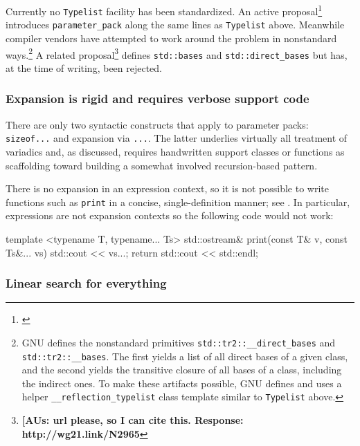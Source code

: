 \noindent Currently no \lstinline!Typelist! facility has been standardized. An active
proposal{\cprotect\footnote{\cite{spertus13}}}
introduces \lstinline!parameter_pack! along the same lines as
\lstinline!Typelist! above. Meanwhile compiler vendors have attempted to
work around the problem in nonstandard ways.{\cprotect\footnote{GNU
defines the nonstandard primitives
\lstinline!std::tr2::__direct_bases! and \lstinline!std::tr2::__bases!.
The first yields a list of all direct bases of a given class, and the
second yields the transitive closure of all bases of a class,
including the indirect ones. To make these artifacts possible, GNU
defines and uses a helper \lstinline!__reflection_typelist! class
  template similar to \lstinline!Typelist! above.}} A related
proposal{\cprotect\footnote{\textbf{[AUs: url please, so I can cite this.  Response: http://wg21.link/N2965}}} defines
\lstinline!std::bases! and \lstinline!std::direct_bases! but has, at the time
of writing, been rejected.

\subsubsection[Expansion is rigid and requires verbose support code]{Expansion is rigid and requires verbose support code}\label{expansion-is-rigid-and-requires-verbose-support-code}

There are only two syntactic constructs that apply to parameter packs:
\lstinline!sizeof...! and expansion via \lstinline!...!. The latter underlies
virtually all treatment of variadics and, as discussed, requires
handwritten support classes or functions as scaffolding toward building
a somewhat involved recursion-based pattern.

There is no expansion in an expression context, so it is not possible to
write functions such as \lstinline!print! in a concise, single-definition
manner; see . In particular, expressions are not expansion contexts so
the following code would not work:

\begin{emcppslisting}
template <typename T, typename... Ts>
std::ostream& print(const T& v, const Ts&... vs)
{
    std::cout << vs...;
    return std::cout << std::endl;
}
\end{emcppslisting}
    

\subsubsection[Linear search for everything]{Linear search for everything}\label{linear-search-for-everything}

